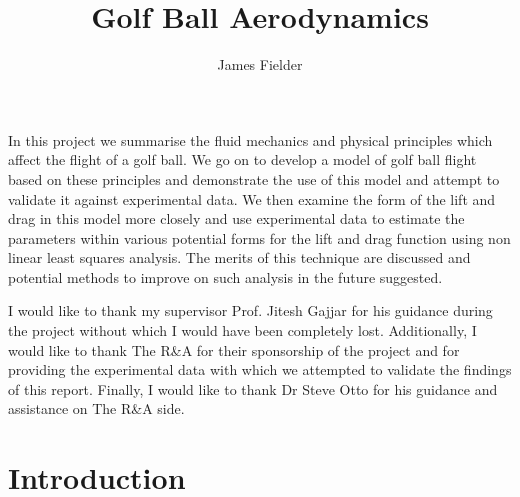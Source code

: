 \documentclass[12pt,MSc,twoside]{muthesis}
\numberwithin{equation}{section}
\begin{document}
\title{Golf Ball Aerodynamics}
\author{James Fielder}
\def\wordcount{11629}




\beforeabstract

In this project we summarise the fluid mechanics and physical principles which
affect the flight of a golf ball. We go on to develop a model of golf ball flight
based on these principles and demonstrate the use of this model and attempt to validate it against
experimental data. We then examine the form of the lift and drag in this model more closely and
use experimental data to estimate the parameters within various potential forms for the lift and drag
function using non linear least squares analysis. The merits of this technique are discussed and
potential methods to improve on such analysis in the future suggested.

\afterabstract

I would like to thank my supervisor Prof. Jitesh Gajjar for his guidance during the project without 
which I would have been completely lost. Additionally, I would like to thank The R\&A for their sponsorship of the project and for providing the experimental data with which we attempted to
validate the findings of this report. Finally, I would like to thank Dr Steve Otto for his guidance and assistance on The R\&A side.

\afterpreface


\pagestyle{normal}
\chapter{Introduction}

\end{document}
